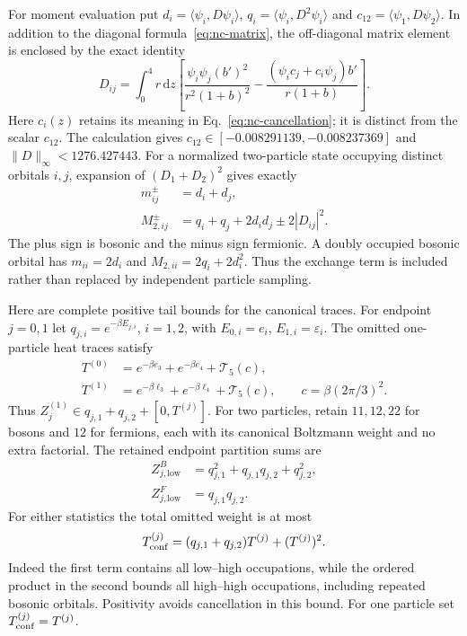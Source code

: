 \documentclass[aps,pra,reprint,superscriptaddress,longbibliography]{revtex4-2}
\newcommand{\dd}{\mathrm d}
\begin{document}
For moment evaluation put $d_i=\langle\psi_i,D\psi_i\rangle$,
$q_i=\langle\psi_i,D^2\psi_i\rangle$ and
$c_{12}=\langle\psi_1,D\psi_2\rangle$.
In addition to the diagonal formula~\eqref{eq:nc-matrix}, the
off-diagonal matrix element is enclosed by the exact identity
\begin{equation}
 D_{ij}=\int_0^4r\,\dd z\left[
 \frac{\psi_i\psi_j(b')^2}{r^2(1+b)^2}
 -\frac{(\psi_ic_j+c_i\psi_j)b'}{r(1+b)}\right].
 \label{eq:nc-exchange-integral}
\end{equation}
Here $c_i(z)$ retains its meaning in Eq.~\eqref{eq:nc-cancellation};
it is distinct from the scalar $c_{12}$.
The calculation gives
$c_{12}\in[-0.008291139,-0.008237369]$ and
$\|D\|_\infty<1276.427443$.
For a normalized two-particle state occupying distinct orbitals
$i,j$, expansion of $(D_1+D_2)^2$ gives exactly
\begin{align}
 m_{ij}^{\pm}&=d_i+d_j,\nonumber\\
 M_{2,ij}^{\pm}&=q_i+q_j+2d_id_j\pm2|D_{ij}|^2.
 \label{eq:nc-two-moments}
\end{align}
The plus sign is bosonic and the minus sign fermionic.
A doubly occupied bosonic orbital has
$m_{ii}=2d_i$ and $M_{2,ii}=2q_i+2d_i^2$.
Thus the exchange term is included rather than replaced by independent
particle sampling.

Here are complete positive tail bounds for the canonical traces.
For endpoint $j=0,1$ let
$q_{j,i}=e^{-\beta E_{j,i}}$, $i=1,2$, with
$E_{0,i}=e_i$, $E_{1,i}=\varepsilon_i$.
The omitted one-particle heat traces satisfy
\begin{align}
 T^{(0)}&=e^{-\beta e_3}+e^{-\beta e_4}+\mathcal T_5(c),\nonumber\\
 T^{(1)}&=e^{-\beta\ell_3}+e^{-\beta\ell_4}
                                    +\mathcal T_5(c),
 \qquad c=\beta(2\pi/3)^2.
 \label{eq:nc-prep-tails}
\end{align}
Thus $Z_j^{(1)}\in q_{j,1}+q_{j,2}+[0,T^{(j)}]$.
For two particles, retain $11,12,22$ for bosons and $12$ for
fermions, each with its canonical Boltzmann weight and no extra
factorial.  The retained endpoint partition sums are
\begin{align}
 Z_{j,\mathrm{low}}^{B}&=q_{j,1}^2+q_{j,1}q_{j,2}+q_{j,2}^2,
 \nonumber\\
 Z_{j,\mathrm{low}}^{F}&=q_{j,1}q_{j,2}.
 \label{eq:nc-partition-low}
\end{align}
For either statistics the total omitted weight is at most
\begin{equation}
 T_{\rm conf}^{(j)}
 =(q_{j,1}+q_{j,2})T^{(j)}+(T^{(j)})^2.
 \label{eq:nc-configuration-tail}
\end{equation}
Indeed the first term contains all low--high occupations, while the
ordered product in the second bounds all high--high occupations,
including repeated bosonic orbitals.  Positivity avoids cancellation
in this bound.  For one particle set $T_{\rm conf}^{(j)}=T^{(j)}$.
\end{document}
